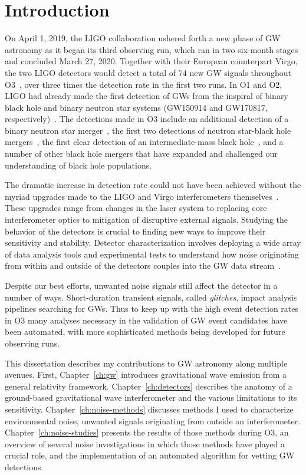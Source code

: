 \chapter{Introduction}

On April 1, 2019, the \ac{LIGO} collaboration ushered forth a new phase of \ac{GW} astronomy as it began its third observing run, which ran in two six-month stages and concluded March 27, 2020.
Together with their European counterpart Virgo, the two \ac{LIGO} detectors would detect a total of 74 new \ac{GW} signals throughout \ac{O3}~\citep{gwtc2, gwtc3}, over three times the detection rate in the first two runs.
In \ac{O1} and \ac{O2}, \ac{LIGO} had already made the first detection of \acp{GW} from the inspiral of binary black hole and binary neutron star systems (GW150914 and GW170817, respectively)~\citep{gw150914, gw170817}.
The detections made in \ac{O3} include an additional detection of a binary neutron star merger~\citep{gw190425}, the first two detections of neutron star-black hole mergers~\citep{nsbh_o3}, the first clear detection of an intermediate-mass black hole~\citep{gw190521}, and a number of other black hole mergers that have expanded and challenged our understanding of black hole populations.

The dramatic increase in detection rate could not have been achieved without the myriad upgrades made to the LIGO and Virgo interferometers themselves~\citep{Buikema_2020}.
These upgrades range from changes in the laser system to replacing core interferometer optics to mitigation of disruptive external signals.
Studying the behavior of the detectors is crucial to finding new ways to improve their sensitivity and stability.
Detector characterization involves deploying a wide array of data analysis tools and experimental tests to understand how noise originating from within and outside of the detectors couples into the \ac{GW} data stream~\citep{Davis_2019, Davis_2021}.

Despite our best efforts, unwanted noise signals still affect the detector in a number of ways.
Short-duration transient signals, called \textit{glitches}, impact analysis pipelines searching for \acp{GW}.
Thus to keep up with the high event detection rates in \ac{O3} many analyses necessary in the validation of \ac{GW} event candidates have been automated, with more sophisticated methods being developed for future observing runs.

This dissertation describes my contributions to \ac{GW} astronomy along multiple avenues. First, Chapter~\ref{ch:gw} introduces gravitational wave emission from a general relativity framework. Chapter~\ref{ch:detectors} describes the anatomy of a ground-based gravitational wave interferometer and the various limitations to its sensitivity. Chapter~\ref{ch:noise-methods} discusses methods I used to characterize environmental noise, unwanted signals originating from outside an interferometer. Chapter~\ref{ch:noise-studies} presents the results of those methods during O3, an overview of several noise investigations in which those methods have played a crucial role, and the implementation of an automated algorithm for vetting \ac{GW} detections.

